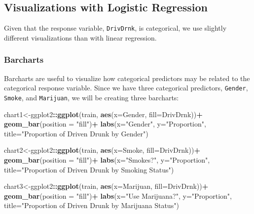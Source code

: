 \documentclass[
]{book}
\newenvironment{Shaded}{\begin{snugshade}}{\end{snugshade}}
\newcommand{\AttributeTok}[1]{\textcolor[rgb]{0.13,0.29,0.53}{#1}}
\newcommand{\FunctionTok}[1]{\textcolor[rgb]{0.13,0.29,0.53}{\textbf{#1}}}
\newcommand{\NormalTok}[1]{#1}
\newcommand{\OtherTok}[1]{\textcolor[rgb]{0.56,0.35,0.01}{#1}}
\newcommand{\SpecialCharTok}[1]{\textcolor[rgb]{0.81,0.36,0.00}{\textbf{#1}}}
\newcommand{\StringTok}[1]{\textcolor[rgb]{0.31,0.60,0.02}{#1}}
\begin{document}
\hypertarget{visualizations-with-logistic-regression}{%
\subsection*{Visualizations with Logistic Regression}\label{visualizations-with-logistic-regression}}

Given that the response variable, \texttt{DrivDrnk}, is categorical, we use slightly different visualizations than with linear regression.

\hypertarget{barcharts}{%
\subsubsection*{Barcharts}\label{barcharts}}

Barcharts are useful to visualize how categorical predictors may be related to the categorical response variable. Since we have three categorical predictors, \texttt{Gender}, \texttt{Smoke}, and \texttt{Marijuan}, we will be creating three barcharts:

\begin{Shaded}
\begin{Highlighting}[]
\NormalTok{chart1}\OtherTok{\textless{}{-}}\NormalTok{ggplot2}\SpecialCharTok{::}\FunctionTok{ggplot}\NormalTok{(train, }\FunctionTok{aes}\NormalTok{(}\AttributeTok{x=}\NormalTok{Gender, }\AttributeTok{fill=}\NormalTok{DrivDrnk))}\SpecialCharTok{+}
  \FunctionTok{geom\_bar}\NormalTok{(}\AttributeTok{position =} \StringTok{"fill"}\NormalTok{)}\SpecialCharTok{+}
  \FunctionTok{labs}\NormalTok{(}\AttributeTok{x=}\StringTok{"Gender"}\NormalTok{, }\AttributeTok{y=}\StringTok{"Proportion"}\NormalTok{,}
       \AttributeTok{title=}\StringTok{"Proportion of Driven Drunk by Gender"}\NormalTok{)}

\NormalTok{chart2}\OtherTok{\textless{}{-}}\NormalTok{ggplot2}\SpecialCharTok{::}\FunctionTok{ggplot}\NormalTok{(train, }\FunctionTok{aes}\NormalTok{(}\AttributeTok{x=}\NormalTok{Smoke, }\AttributeTok{fill=}\NormalTok{DrivDrnk))}\SpecialCharTok{+}
  \FunctionTok{geom\_bar}\NormalTok{(}\AttributeTok{position =} \StringTok{"fill"}\NormalTok{)}\SpecialCharTok{+}
  \FunctionTok{labs}\NormalTok{(}\AttributeTok{x=}\StringTok{"Smokes?"}\NormalTok{, }\AttributeTok{y=}\StringTok{"Proportion"}\NormalTok{,}
       \AttributeTok{title=}\StringTok{"Proportion of Driven Drunk by Smoking Status"}\NormalTok{)}

\NormalTok{chart3}\OtherTok{\textless{}{-}}\NormalTok{ggplot2}\SpecialCharTok{::}\FunctionTok{ggplot}\NormalTok{(train, }\FunctionTok{aes}\NormalTok{(}\AttributeTok{x=}\NormalTok{Marijuan, }\AttributeTok{fill=}\NormalTok{DrivDrnk))}\SpecialCharTok{+}
  \FunctionTok{geom\_bar}\NormalTok{(}\AttributeTok{position =} \StringTok{"fill"}\NormalTok{)}\SpecialCharTok{+}
  \FunctionTok{labs}\NormalTok{(}\AttributeTok{x=}\StringTok{"Use Marijuana?"}\NormalTok{, }\AttributeTok{y=}\StringTok{"Proportion"}\NormalTok{,}
       \AttributeTok{title=}\StringTok{"Proportion of Driven Drunk by Marijuana Status"}\NormalTok{)}
\end{Highlighting}
\end{Shaded}
\end{document}
